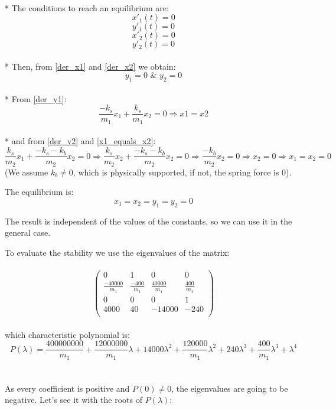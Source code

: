\documentclass[a4paper]{article}
\begin{document}
\\*
The conditions to reach an equilibrium are:
\begin{equation}\label{der_x1}
	x'_1(t)=0
\end{equation}
\begin{equation}\label{der_y1}
	y'_1(t)=0
\end{equation}
\begin{equation}\label{der_x2}
	x'_2(t)=0
\end{equation}
\begin{equation}\label{der_y2}
	y'_2(t)=0
\end{equation}
\\*
Then, from \ref{der_x1} and \ref{der_x2} we obtain:
\begin{equation}
	y_1=0 \,\,\& \,\, y_2=0
\end{equation}
\\*
From \ref{der_y1}:
\begin{equation}\label{x1_equals_x2}
	\frac{-k_s}{m_1}x_1+\frac{k_s}{m_1}x_2=0 \Rightarrow x1=x2
\end{equation}
\\*
and from \ref{der_y2} and \ref{x1_equals_x2}:
\begin{equation}
  \frac{k_s}{m_2}x_1+\frac{-k_s-k_b}{m_2}x_2=0
  \Rightarrow
  \frac{k_s}{m_2}x_2+\frac{-k_s-k_b}{m_2}x_2=0
  \Rightarrow
  \frac{-k_b}{m_2}x_2=0
  \Rightarrow
  x_2=0
  \Rightarrow
  x_1=x_2=0 
\end{equation}
(We assume $k_b\neq 0$, which is physically supported,
if not, the spring force is 0).


\newpage


The equilibrium is:
$$x_1=x_2=y_1=y_2=0$$

The result is independent of the values of the constants,
so we can use it in the general case.

To evaluate the stability we use the eigenvalues of the matrix:\\
\\
$$
  \begin{pmatrix} 
	0 & 1 & 0 & 0 \\
    \frac{-40000}{m_1} & \frac{-400}{m_1} & \frac{40000}{m_1} & \frac{400}{m_1} \\
    0 & 0 & 0 & 1\\
    4000 & 40 & -14000 & -240 \\
  \end{pmatrix}
$$
\\
which characteristic polynomial is:
\begin{equation}
  P(\lambda) =
  \frac{400000000}{m_1} +
  \frac{12000000}{m_1}\lambda +
  14000\lambda^2 +
  \frac{120000}{m_1} \lambda^2+240\lambda^3 +
  \frac{400}{m_1}\lambda^3 +
  \lambda^4
\end{equation}
\\
\\
As every coefficient is positive and $P(0)\neq 0$, the eigenvalues are going to be negative.
Let's see it with the roots of $P(\lambda)$:
\end{document}
